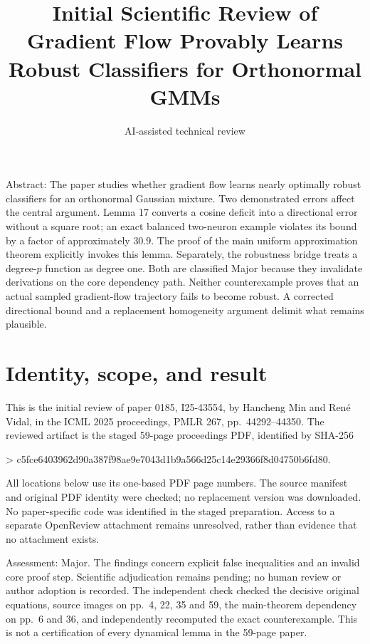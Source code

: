 \documentclass[10pt]{article}
\title{Initial Scientific Review of
Gradient Flow Provably Learns Robust Classifiers for Orthonormal GMMs}
\author{AI-assisted technical review}
\date{}
\begin{document}
\maketitle
Abstract: The paper studies whether gradient flow learns nearly optimally robust classifiers for an orthonormal Gaussian mixture. Two demonstrated errors affect the central argument. Lemma 17 converts a cosine deficit into a directional error without a square root; an exact balanced two-neuron example violates its bound by a factor of approximately \(30.9\). The proof of the main uniform approximation theorem explicitly invokes this lemma. Separately, the robustness bridge treats a degree-\(p\) function as degree one. Both are classified Major because they invalidate derivations on the core dependency path. Neither counterexample proves that an actual sampled gradient-flow trajectory fails to become robust. A corrected directional bound and a replacement homogeneity argument delimit what remains plausible.\par
\section*{Identity, scope, and result}
This is the initial review of paper 0185, I25-43554, by Hancheng Min and René Vidal, in the ICML 2025 proceedings, PMLR 267, pp. 44292–44350. The reviewed artifact is the staged 59-page proceedings PDF, identified by SHA-256\par
> c5fce6403962d90a387f98ae9e7043d1b9a566d25c14e29366f8d04750b6fd80.\par
All locations below use its one-based PDF page numbers. The source manifest and original PDF identity were checked; no replacement version was downloaded. No paper-specific code was identified in the staged preparation. Access to a separate OpenReview attachment remains unresolved, rather than evidence that no attachment exists.\par
Assessment: Major. The findings concern explicit false inequalities and an invalid core proof step. Scientific adjudication remains pending; no human review or author adoption is recorded. The independent check checked the decisive original equations, source images on pp. 4, 22, 35 and 59, the main-theorem dependency on pp. 6 and 36, and independently recomputed the exact counterexample. This is not a certification of every dynamical lemma in the 59-page paper.\par
\end{document}
